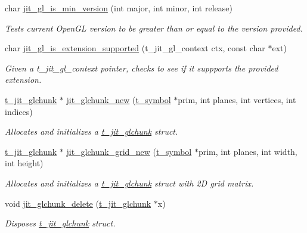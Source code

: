 \begin{DoxyCompactItemize}
char \hyperlink{group__ob3dmod_gad29a8caf0ac02591e97cb18176eac0e0}{jit\_\-gl\_\-is\_\-min\_\-version} (int major, int minor, int release)
\begin{DoxyCompactList}\small\item\em Tests current OpenGL version to be greater than or equal to the version provided. \item\end{DoxyCompactList}\item 
char \hyperlink{group__ob3dmod_ga7fbf145730cc56b69fa200adfee552a1}{jit\_\-gl\_\-is\_\-extension\_\-supported} (t\_\-jit\_\-gl\_\-context ctx, const char $\ast$ext)
\begin{DoxyCompactList}\small\item\em Given a t\_\-jit\_\-gl\_\-context pointer, checks to see if it suppports the provided extension. \item\end{DoxyCompactList}\item 
\hyperlink{structt__jit__glchunk}{t\_\-jit\_\-glchunk} $\ast$ \hyperlink{group__ob3dmod_gae1cfab3f91302b90cdcd8e8723295f91}{jit\_\-glchunk\_\-new} (\hyperlink{structt__symbol}{t\_\-symbol} $\ast$prim, int planes, int vertices, int indices)
\begin{DoxyCompactList}\small\item\em Allocates and initializes a \hyperlink{structt__jit__glchunk}{t\_\-jit\_\-glchunk} struct. \item\end{DoxyCompactList}\item 
\hyperlink{structt__jit__glchunk}{t\_\-jit\_\-glchunk} $\ast$ \hyperlink{group__ob3dmod_ga5c8a73551161b7ba602c0bea2ea9e479}{jit\_\-glchunk\_\-grid\_\-new} (\hyperlink{structt__symbol}{t\_\-symbol} $\ast$prim, int planes, int width, int height)
\begin{DoxyCompactList}\small\item\em Allocates and initializes a \hyperlink{structt__jit__glchunk}{t\_\-jit\_\-glchunk} struct with 2D grid matrix. \item\end{DoxyCompactList}\item 
void \hyperlink{group__ob3dmod_gae4fabfa866a64f68987de90e065e604e}{jit\_\-glchunk\_\-delete} (\hyperlink{structt__jit__glchunk}{t\_\-jit\_\-glchunk} $\ast$x)
\begin{DoxyCompactList}\small\item\em Disposes \hyperlink{structt__jit__glchunk}{t\_\-jit\_\-glchunk} struct. \item\end{DoxyCompactList}\item 

\end{DoxyCompactItemize}
